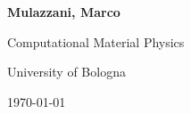 \begin{minipage}{0.75\textwidth}

    \Large{\textbf{}} %
    
    \vspace{4mm}
    
    \large{\textbf{Mulazzani, Marco}} %
    \vspace{2mm}
    
    Computational Material Physics %
    
    University of Bologna%
    \vspace{1mm} 
    
    \today %

\end{minipage}